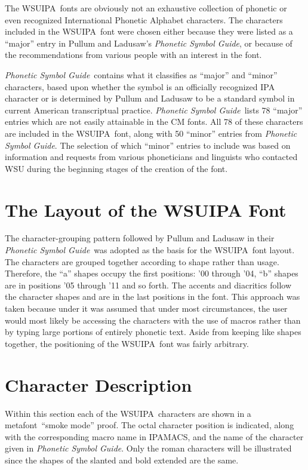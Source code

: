 \documentclass[12pt]{article}
\newcommand{\MF}{{\rm\sc{}metafont}}
\newcommand{\wsu}{{\small\rm WSUIPA}}
\newcommand{\ipam}{{\small\rm IPAMACS}}
\newcommand{\PL}{{\em Phonetic Symbol Guide}}
\begin{document}
The \wsu\ fonts are obviously not an exhaustive collection of phonetic
or even recognized International Phonetic Alphabet characters. The
characters included in the \wsu\ font were chosen either because they
were listed as a ``major'' entry in Pullum and Ladusaw's \PL, or
because of the recommendations from various people with an interest in
the font.

\PL\ contains what it classifies as ``major'' and ``minor''
characters, based upon whether the symbol is an officially recognized
IPA character or is determined by Pullum and Ladusaw to be a standard
symbol in current American transcriptual practice. \PL\ lists 78
``major'' entries which are not easily attainable in the CM fonts. All
78 of these characters are included in the \wsu\ font, along with 50
``minor'' entries from \PL. The selection of which ``minor'' entries
to include was based on information and requests from various
phoneticians and linguists who contacted WSU during the beginning
stages of the creation of the font.


\section{The Layout of the WSUIPA Font}

The character-grouping pattern followed by Pullum and Ladusaw in their
\PL\ was adopted as the basis for the \wsu\ font layout. The
characters are grouped together according to shape rather than usage.
Therefore, the ``a'' shapes occupy the first positions: '00 through
'04, ``b'' shapes are in positions '05 through '11 and so forth. The
accents and diacritics follow the character shapes and are in the last
positions in the font. This approach was taken because under it was
assumed that under most circumstances, the user would most likely be
accessing the characters with the use of macros rather than by typing
large portions of entirely phonetic text. Aside from keeping like
shapes together, the positioning of the \wsu\ font was fairly
arbitrary.


\section{Character Description}

Within this section each of the \wsu\ characters are shown in a \MF\
``smoke mode'' proof. The octal character position is indicated, along
with the corresponding macro name in \ipam, and the name of the
character given in \PL. Only the roman characters will be illustrated
since the shapes of the slanted and bold extended are the same.
\end{document}
